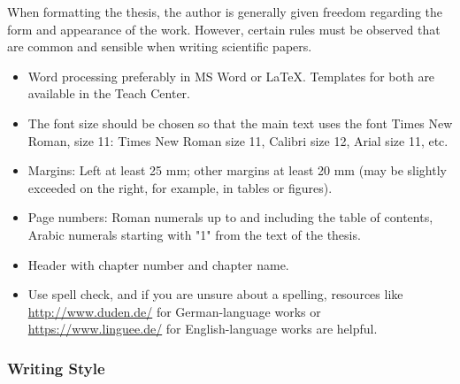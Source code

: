 \documentclass[a4paper, fleqn, headsepline, footsepline, 12pt, parskip=half]{scrartcl}
\begin{document}
When formatting the thesis, the author is generally given freedom regarding the form and appearance of the work. However, certain rules must be observed that are common and sensible when writing scientific papers.

\begin{itemize}
    \item Word processing preferably in MS Word or LaTeX. Templates for both are available in the Teach Center.
    \item The font size should be chosen so that the main text uses the font Times New Roman, size 11: Times New Roman size 11, Calibri size 12, Arial size 11, etc.
    \item Margins: Left at least 25 mm; other margins at least 20 mm (may be slightly exceeded on the right, for example, in tables or figures).
    \item Page numbers: Roman numerals up to and including the table of contents, Arabic numerals starting with "1" from the text of the thesis.
    \item Header with chapter number and chapter name.
    \item Use spell check, and if you are unsure about a spelling, resources like \url{http://www.duden.de/} for German-language works or \url{https://www.linguee.de/} for English-language works are helpful.
\end{itemize}


\subsubsection{Writing Style}
\label{sec:writingStyle}
\end{document}
